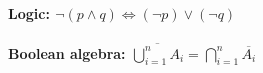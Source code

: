 \documentclass[12pt]{article}
\begin{document}
\paragraph
{
Logic:
${ \displaystyle
  \neg(p\wedge q)\iff(\neg p)\vee(\neg q)
}$
}
\paragraph
{
Boolean algebra:
${ \displaystyle
  \overline{\bigcup_{i=1}^{n} A_{i}}=\bigcap_{i=1}^{n} \overline{A_{i}}
}$
}
\end{document}
